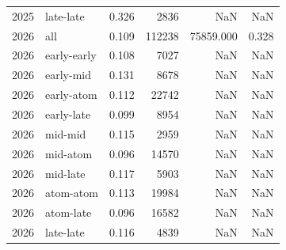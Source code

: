\begin{table}
\begin{tabular}{rlrrrr}
2025 & late-late & 0.326 & 2836 & NaN & NaN \\
2026 & all & 0.109 & 112238 & 75859.000 & 0.328 \\
2026 & early-early & 0.108 & 7027 & NaN & NaN \\
2026 & early-mid & 0.131 & 8678 & NaN & NaN \\
2026 & early-atom & 0.112 & 22742 & NaN & NaN \\
2026 & early-late & 0.099 & 8954 & NaN & NaN \\
2026 & mid-mid & 0.115 & 2959 & NaN & NaN \\
2026 & mid-atom & 0.096 & 14570 & NaN & NaN \\
2026 & mid-late & 0.117 & 5903 & NaN & NaN \\
2026 & atom-atom & 0.113 & 19984 & NaN & NaN \\
2026 & atom-late & 0.096 & 16582 & NaN & NaN \\
2026 & late-late & 0.116 & 4839 & NaN & NaN \\
\bottomrule
\end{tabular}
\end{table}
